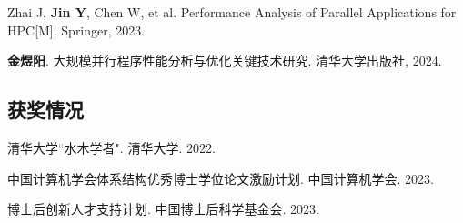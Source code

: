 \begin{resume}
  \begin{achievements}
    \item Zhai J, \textbf{Jin Y}, Chen W, et al. Performance Analysis of Parallel Applications for HPC[M]. Springer, 2023.
    \item \textbf{金煜阳}. 大规模并行程序性能分析与优化关键技术研究. 清华大学出版社, 2024.
  \end{achievements}

  \subsection*{获奖情况}

  \begin{achievements}
    \item 清华大学``水木学者". 清华大学. 2022.
    \item 中国计算机学会体系结构优秀博士学位论文激励计划. 中国计算机学会. 2023.
    \item 博士后创新人才支持计划. 中国博士后科学基金会. 2023.
  \end{achievements}

\end{resume}




%
%
%
%
%
%
%
%
%
